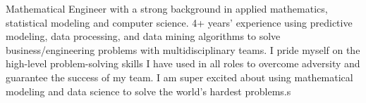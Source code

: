 

\begin{cvparagraph}




Mathematical Engineer with a strong background in applied mathematics, statistical modeling and computer science. 
4+ years’ experience using predictive modeling, data processing, and data mining algorithms to solve business/engineering
problems with multidisciplinary teams. I pride myself on the high-level problem-solving skills I have used in all roles to
overcome adversity and guarantee the success of my team. I am super excited about using mathematical modeling and data science
to solve the world's hardest problems.s
\end{cvparagraph}
